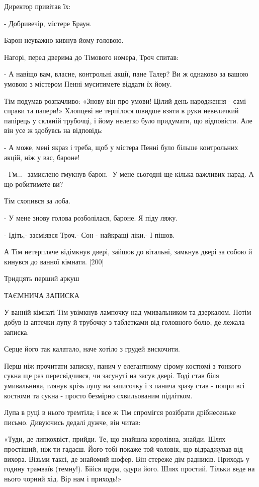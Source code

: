 Директор привітав їх:

- Добривечір, містере Браун.

Барон неуважно кивнув йому головою.

Нагорі, перед дверима до Тімового номера, Троч спитав:

- А навіщо вам, власне, контрольні акції, пане Талер? Ви ж однаково за вашою умовою з містером Пенні муситимете віддати їх йому.

Тім подумав розпачливо: «Знову він про умови! Цілий день народження - самі справи та папери!» Хлопцеві не терпілося швидше взяти в руки невеличкий папірець у скляній трубочці, і йому нелегко було придумати, що відповісти. Але він усе ж здобувсь на відповідь:

- А може, мені якраз і треба, щоб у містера Пенні було більше контрольних акцій, ніж у вас, бароне!

- Гм...- замислено гмукнув барон.- У мене сьогодні ще кілька важливих нарад. А що робитимете ви?

Тім схопився за лоба.

- У мене знову голова розболілася, бароне. Я піду ляжу.

- Ідіть,- засміявся Троч.- Сон - найкращі ліки.- І пішов.

А Тім нетерпляче відімкнув двері, зайшов до вітальні, замкнув двері за собою й кинувся до ванної кімнати. [200]

Тридцять перший аркуш

ТАЄМНИЧА ЗАПИСКА

У ванній кімнаті Тім увімкнув лампочку над умивальником та дзеркалом. Потім добув із аптечки лупу й трубочку з таблетками від головного болю, де лежала записка.

Серце його так калатало, наче хотіло з грудей вискочити.

Перш ніж прочитати записку, панич у елегантному сірому костюмі з тонкого сукна ще раз пересвідчився, чи засунуті на засув двері. Тоді став біля умивальника, глянув крізь лупу на записочку і з панича зразу став - попри всі костюми та сукна - просто безмірно схвильованим підлітком.

Лупа в руці в нього тремтіла; і все ж Тім спромігся розібрати дрібнесеньке письмо. Дивуючись дедалі дужче, він читав:

«Туди, де липкохвіст, прийди. Те, що знайшла королівна, знайди. Шлях простіший, ніж ти гадаєш. Його тобі покаже той чоловік, що відраджував від вихора. Візьми таксі, де знайомий шофер. Він стереже дім радників. Приходь у годину трамваїв (темну!). Бійся щура, одури його. Шлях простий. Тільки веде на нього чорний хід. Вір нам і приходь!»

